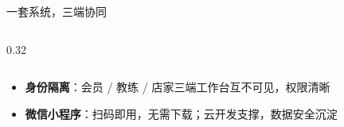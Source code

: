 \documentclass[aspectratio=169,11pt]{ctexbeamer}
\begin{document}
\begin{frame}{一套系统，三端协同}
\begin{columns}[T]
\begin{column}{0.32\textwidth}

    \end{column}

  \end{columns}

  \vspace{1.0em}

  \begin{itemize}

    \setlength{\itemsep}{0.4em}

    \item \textbf{身份隔离}：会员 / 教练 / 店家三端工作台互不可见，权限清晰

    \item \textbf{微信小程序}：扫码即用，无需下载；云开发支撑，数据安全沉淀

  \end{itemize}

\end{frame}



\end{document}
